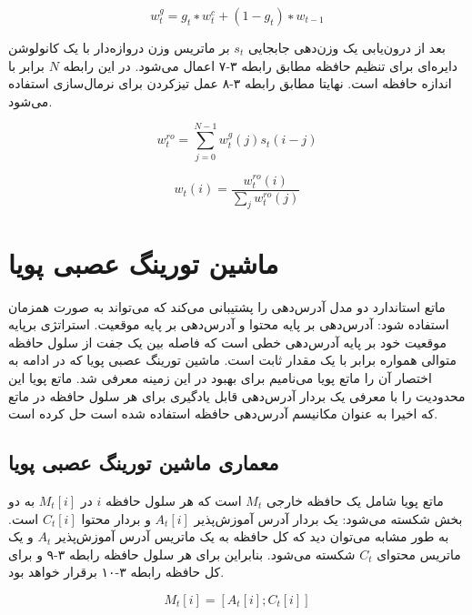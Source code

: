 \begin{equation}
w^g_t = g_t ∗ w^c_t + (1 - g_t) ∗ w_{t−1}
\end{equation}

بعد از درون‌یابی یک وزن‌دهی جابجایی $s_t$ بر ماتریس وزن دروازه‌دار با یک کانولوشن دایره‌ای برای تنظیم حافظه مطابق رابطه ۳-۷ اعمال می‌شود. در این رابطه $N$ برابر با اندازه حافظه است. نهایتا مطابق رابطه ۳-۸ عمل تیزکردن برای نرمال‌سازی استفاده می‌شود.\cite{zhao2020cold}

\begin{equation}
w_t^{ro} = \sum_{j=0}^{N-1}w_t^g(j)s_t(i-j)
\end{equation}

\begin{equation}
w_t(i) = \frac{w_t^{ro}(i)}{\sum_j w_t^{ro}(j)}
\end{equation}

\section{ماشین تورینگ عصبی پویا}

ماتع استاندارد دو مدل آدرس‌دهی را پشتیبانی می‌کند که می‌تواند به صورت همزمان استفاده شود: آدرس‌دهی بر پایه محتوا و آدرس‌دهی بر پایه موقعیت. استراتژی برپایه موقعیت خود بر پایه آدرس‌دهی خطی است که فاصله بین یک جفت از سلول حافظه متوالی همواره برابر با یک مقدار ثابت است. ماشین تورینگ عصبی پویا که در ادامه به اختصار آن را ماتع پویا می‌نامیم برای بهبود در این زمینه معرفی شد. ماتع پویا این محدودیت را با معرفی یک بردار آدرس‌دهی قابل یادگیری برای هر سلول حافظه در ماتع که اخیرا به عنوان مکانیسم آدرس‌دهی حافظه استفاده شده است حل کرده است.\cite{gulcehre2018dynamic}

\subsection{معماری ماشین تورینگ عصبی پویا}
ماتع پویا شامل یک حافظه خارجی $M_t$ است که هر سلول حافظه $i$ در $M_t[i]$ به دو بخش شکسته می‌شود: 
یک بردار آدرس آموزش‌پذیر $A_t[i]$ و بردار محتوا $C_t[i]$ است. به طور مشابه می‌توان دید که کل حافظه به یک ماتریس آدرس آموزش‌پذیر $A_t$ و یک ماتریس محتوای $C_t$ شکسته می‌شود. بنابراین برای هر سلول حافظه رابطه ۳-۹ و برای کل حافظه رابطه ۳-۱۰ برقرار خواهد بود.\cite{gulcehre2018dynamic}

\begin{equation}
M_t[i] = [A_t[i]; C_t[i]]
\end{equation}

